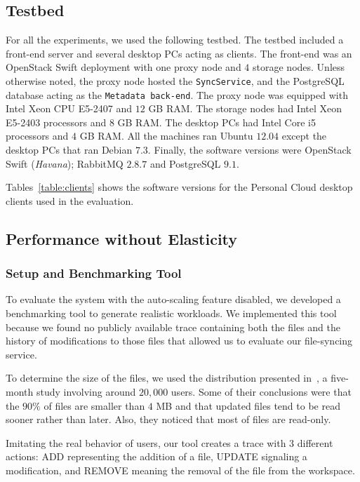\subsection{Testbed}

For all the experiments, we used the following testbed. The testbed included a front-end server and several desktop 
PCs acting as clients. The front-end was an OpenStack Swift deployment with one proxy node and $4$ storage nodes.  
Unless otherwise noted, the proxy node hosted the \texttt{SyncService}, and the PostgreSQL database acting as the \texttt{Metadata back-end}.  
The proxy node was equipped with Intel Xeon CPU E5-2407 and $12$ GB RAM. The storage nodes 
had Intel Xeon E5-2403 processors and $8$ GB RAM. The desktop PCs had Intel Core i5 processors and $4$ GB RAM. 
All the machines ran Ubuntu $12.04$ except the desktop PCs that ran Debian $7.3$. Finally, the software versions were OpenStack Swift (\textit{Havana});  
RabbitMQ $2.8.7$ and PostgreSQL $9.1$. 

Tables~\ref{table:clients} shows the software versions for the Personal Cloud desktop clients used in the evaluation.

\subsection{Performance without Elasticity}

\subsubsection{Setup and Benchmarking Tool}

To evaluate the system with the auto-scaling feature disabled, we developed a benchmarking tool to generate
realistic workloads. We implemented this tool because we found no publicly available trace containing both 
the files and the history of modifications to those files that allowed us to evaluate our file-syncing service.

To determine the size of the files, we used the distribution presented in~\cite{liu2013},
a five-month study involving around $20,000$ users. Some of their conclusions
were that the $90\%$ of files are smaller than $4$ MB and that updated files tend to be read sooner
rather than later. Also, they noticed that most of files are read-only.

Imitating the real behavior of users, our tool creates a trace with $3$ different actions: ADD representing the addition
of a file, UPDATE signaling a modification, and REMOVE meaning the removal of the file from the workspace.

